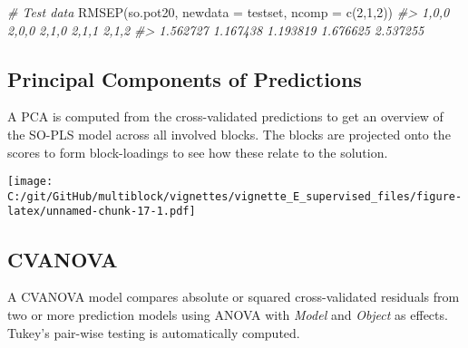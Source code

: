 \documentclass[
]{article}
\newenvironment{Shaded}{\begin{snugshade}}{\end{snugshade}}
\newcommand{\AttributeTok}[1]{\textcolor[rgb]{0.77,0.63,0.00}{#1}}
\newcommand{\CommentTok}[1]{\textcolor[rgb]{0.56,0.35,0.01}{\textit{#1}}}
\newcommand{\DecValTok}[1]{\textcolor[rgb]{0.00,0.00,0.81}{#1}}
\newcommand{\FunctionTok}[1]{\textcolor[rgb]{0.00,0.00,0.00}{#1}}
\newcommand{\NormalTok}[1]{#1}
\newcommand{\OtherTok}[1]{\textcolor[rgb]{0.56,0.35,0.01}{#1}}
\begin{document}
\begin{Shaded}
\begin{Highlighting}[]
\CommentTok{\# Test data}
\FunctionTok{RMSEP}\NormalTok{(so.pot20, }\AttributeTok{newdata =}\NormalTok{ testset, }\AttributeTok{ncomp =} \FunctionTok{c}\NormalTok{(}\DecValTok{2}\NormalTok{,}\DecValTok{1}\NormalTok{,}\DecValTok{2}\NormalTok{))}
\CommentTok{\#\textgreater{}    1,0,0    2,0,0    2,1,0    2,1,1    2,1,2 }
\CommentTok{\#\textgreater{} 1.562727 1.167438 1.193819 1.676625 2.537255}
\end{Highlighting}
\end{Shaded}

\hypertarget{principal-components-of-predictions}{%
\subsection{Principal Components of
Predictions}\label{principal-components-of-predictions}}

A PCA is computed from the cross-validated predictions to get an
overview of the SO-PLS model across all involved blocks. The blocks are
projected onto the scores to form block-loadings to see how these relate
to the solution.

\begin{Shaded}
\end{Shaded}

\texttt{[image: C:/git/GitHub/multiblock/vignettes/vignette\_E\_supervised\_files/figure-latex/unnamed-chunk-17-1.pdf]}

\hypertarget{cvanova}{%
\subsection{CVANOVA}\label{cvanova}}

A CVANOVA model compares absolute or squared cross-validated residuals
from two or more prediction models using ANOVA with \emph{Model} and
\emph{Object} as effects. Tukey's pair-wise testing is automatically
computed.
\end{document}
